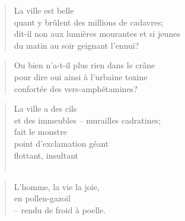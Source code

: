   \begin{verse}
    La ville est belle\\
    quant y brûlent des millions de cadavres;\\
    dit-il non aux lumières mourantes et si jeunes\\
    du matin au soir geignant l’ennui?
  \end{verse}
  \begin{verse}
    Ou bien n’a-t-il plus rien dans le crâne\\
    pour dire oui ainsi à l’urbaine toxine\\
    confortée des vers-amphétamines?
  \end{verse}

  \begin{verse}
    La ville a des cils\\
    et des immeubles -- murailles cadratines;\\
     fait le monstre\\
    point d’exclamation géant\\
    flottant, insultant\\
    ~~~~
  \end{verse}
  \begin{verse}
    L’homme, la vie la joie,\\
    en pollen-gazoil\\
    -- rendu de froid à poelle.
  \end{verse}

